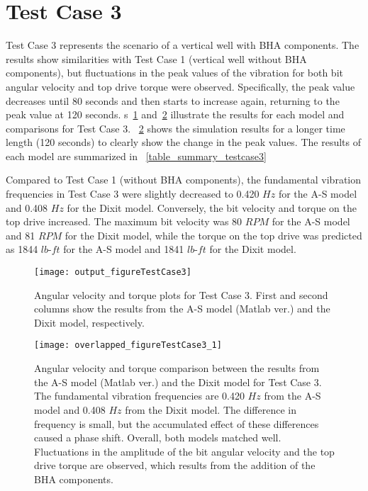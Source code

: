 \section{Test Case 3}
 Test Case 3 represents the scenario of a vertical well with BHA components. The results show similarities with Test Case 1 (vertical well without BHA components), but fluctuations in the peak values of the vibration for both bit angular velocity and top drive torque were observed. Specifically, the peak value decreases until 80 seconds and then starts to increase again, returning to the peak value at 120 seconds. \figurename{}s~\ref{figure_testcase3} and~\ref{figure_testcase3_overlapped} illustrate the results for each model and comparisons for Test Case 3. \figurename~\ref{figure_testcase3_overlapped} shows the simulation results for a longer time length (120 seconds) to clearly show the change in the peak values. The results of each model are summarized in \tablename~\ref{table_summary_testcase3}

Compared to Test Case 1 (without BHA components), the fundamental vibration frequencies in Test Case 3 were slightly decreased to 0.420 $Hz$ for the A-S model and 0.408 $Hz$ for the Dixit model. Conversely, the bit velocity and torque on the top drive increased. The maximum bit velocity was 80 $RPM$ for the A-S model and 81 $RPM$ for the Dixit model, while the torque on the top drive was predicted as 1844 $lb\mbox{-}ft$ for the A-S model and 1841 $lb\mbox{-}ft$ for the Dixit model.

\begin{figure}
	\centering
	\texttt{[image: output\_figureTestCase3]}
    \caption[Angular velocity and torque plots for Test Case 3]{Angular velocity and torque plots for Test Case 3. First and second columns show the results from the A-S model (Matlab ver.) and the Dixit model, respectively.}
	\label{figure_testcase3}
\end{figure}
\begin{figure}
	\centering
	\texttt{[image: overlapped\_figureTestCase3\_1]}
    \caption[Angular velocity and torque comparison plots for Test Case 3]{Angular velocity and torque comparison between the results from the A-S model (Matlab ver.) and the Dixit model for Test Case 3. The fundamental vibration frequencies are 0.420 $Hz$ from the A-S model and 0.408 $Hz$ from the Dixit model. The difference in frequency is small, but the accumulated effect of these differences caused a phase shift. Overall, both models matched well. Fluctuations in the amplitude of the bit angular velocity and the top drive torque are observed, which results from the addition of the BHA components.}
    \label{figure_testcase3_overlapped}
\end{figure}

